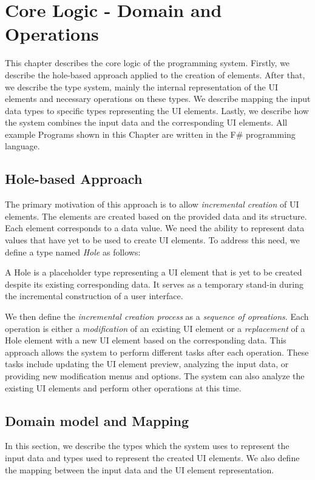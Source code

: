 \chapter{Core Logic - Domain and Operations}
\label{chap:corelogic}


This chapter describes the core logic of the programming system.
Firstly, we describe the hole-based approach applied to the creation of elements.
After that, we describe the type system, mainly the internal representation of the UI elements and necessary operations on these types.
We describe mapping the input data types to specific types representing the UI elements.
Lastly, we describe how the system combines the input data and the corresponding UI elements.
All example Programs shown in this Chapter are written in the F\# programming language.

\section{Hole-based Approach}
\label{sec:hole-based}
The primary motivation of this approach is to allow \emph{incremental creation} of UI elements.
The elements are created based on the provided data and its structure.
Each element corresponds to a data value.
We need the ability to represent data values that have yet to be used to create UI elements.
To address this need, we define a type named \emph{Hole} as follows:
\begin{defn}
	A Hole is a placeholder type representing a UI element that is yet to be created despite its existing corresponding data. It serves as a temporary stand-in during the incremental construction of a user interface.
\end{defn}

We then define the \emph{incremental creation process} as a \emph{sequence of opreations}.
Each operation is either a \emph{modification} of an existing UI element or a \emph{replacement} of a Hole element with a new UI element based on the corresponding data.
This approach allows the system to perform different tasks after each operation.
These tasks include updating the UI element preview, analyzing the input data, or providing new modification menus and options.
The system can also analyze the existing UI elements and perform other operations at this time.


\section{Domain model and Mapping}
\label{sec:types}
In this section, we describe the types which the system uses to represent the input data and types used to represent the created UI elements.
We also define the mapping between the input data and the UI element representation.


